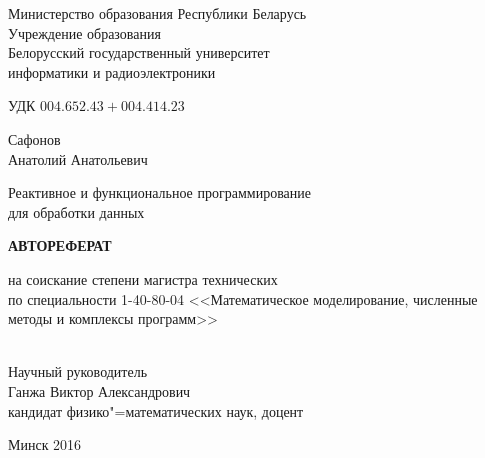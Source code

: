 \begin{titlepage}
  \begin{center}
    Министерство образования Республики Беларусь\\[1em]
    Учреждение образования\\
    Белорусский государственный университет \\
    информатики и радиоэлектроники \\[2em]

    \begin{flushleft}
        УДК $004.652.43+004.414.23$ \\[2cm]
    \end{flushleft}

    \begin{center}
      Сафонов \\ Анатолий Анатольевич\\[3em]
    \end{center}

    {\centering Реактивное и функциональное программирование \\ для обработки данных \\[3em]}


    {\centering\textbf{АВТОРЕФЕРАТ}}\\[2em]

    \begin{center}
      на соискание степени магистра технических \\ по специальности 1-40-80-04 <<Математическое моделирование, численные методы и комплексы программ>>\\[3em]
    \end{center}

    \begin{flushright}
      \underline{\hspace*{7.5cm}} \\[1cm]
      Научный руководитель \\
      Ганжа Виктор Александрович \\
      кандидат физико"=математических наук, доцент \\[1cm]
      \underline{\hspace*{7.5cm}}
    \end{flushright}

    \vfill
    {\normalsize Минск 2016}
  \end{center}
\end{titlepage}
